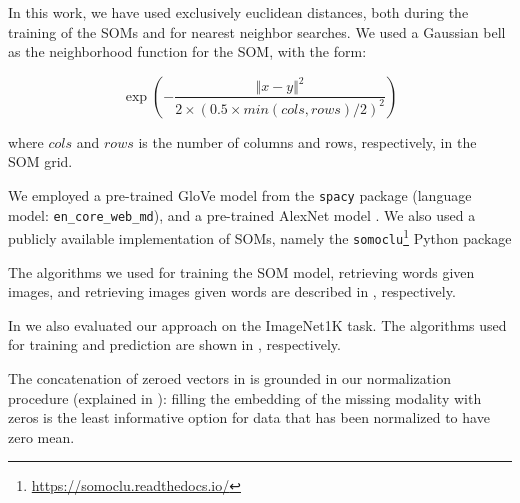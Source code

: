 \documentclass[a4paper]{standalone}
\begin{document}
In this work, we have used exclusively euclidean distances, both during the training of the SOMs and for nearest neighbor searches. We used a Gaussian bell as the neighborhood function for the SOM, with the form:

$$\exp\left(-\frac{\Vert x-y \Vert^2}{2\times (0.5 \times min(cols, rows)/2)^2}\right)$$

where $cols$ and $rows$ is the number of columns and rows, respectively, in the SOM grid.

We employed a pre-trained GloVe model from the \verb|spacy| package \cite{spacy2} (language model: \verb|en_core_web_md|), and a pre-trained AlexNet model \cite{convnets-keras}. We also used a publicly available implementation of SOMs, namely the \verb|somoclu|\footnote{\url{https://somoclu.readthedocs.io/}} Python package

The algorithms we used for training the SOM model, retrieving words given images, and retrieving images given words are described in , respectively.

In  we also evaluated our approach on the ImageNet1K task. The algorithms used for training and prediction are shown in , respectively.

The concatenation of zeroed vectors in  is grounded in our normalization procedure (explained in ): filling the embedding of the missing modality with zeros is the least informative option for data that has been normalized to have zero mean.
\end{document}
